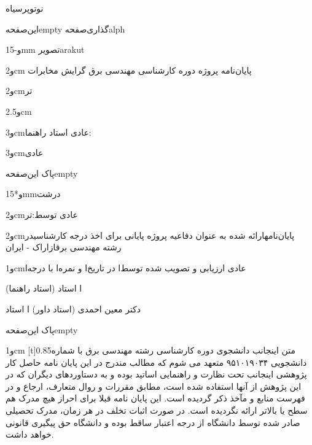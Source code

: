 ‌نو{توپر}{‌سیاه}{}

‌این‌صفحه{empty}
‌گذاری‌صفحه{alph}‬


\onehalfspacing

‌و{-15mm}
‌تصویر{arakut}

\departfa

‌و{2cm} پایان‌نامه پروژه دوره کارشناسی مهندسی برق گرایش مخابرات

‌و{2cm}‌تر\titlefa

‌و{2.5cm}\authorfa

‌و{3cm}‌عادی استاد راهنما: \supervisorfa

‌و{3cm}‌عادی\datefa


‌پاک
‌این‌صفحه{empty}


‌و*{15mm}‌درشت\titlefa

‌و{2cm}‌عادی توسط:‌تر\authorfa

‌و{2cm} پایان‌نامه ارائه شده به عنوان دفاعیه پروژه پایانی برای اخذ درجه کارشناسی در رشته مهندسی برق از \instfa{} اراک - ایران

\doublespacing

‌و{1cm}‌عادی ارزیابی و تصویب شده
توسط‌ا{} در تاریخ‌ا{} و نمره‌ا{} با درجه‌ا{}

\supervisorfa
(استاد راهنما) ‌ا
استاد \instfa

دکتر معین احمدی
(استاد داور) ‌ا
استاد \instfa


‌پاک
‌این‌صفحه{empty}


‌و{1cm}
[t]{0.85‌متن}
\onehalfspacing
اینجانب \authorfa{} دانشجوی دوره کارشناسی رشته مهندسی برق با شماره دانشجویی ۹۵۱۰۱۹۰۳۴ متعهد می شوم که مطالب مندرج در این پايان نامه حاصل کار پژوهشی اینجانب تحت نظارت و راهنمایی اساتید \instfa بوده و به دستاوردهای دیگران که در این پژوهش از آنها استفاده شده است، مطابق مقررات و روال متعارف، ارجاع و در فهرست منابع و مآخذ ذکر گردیده است. این پايان نامه  قبلا برای احراز هیچ مدرک هم سطح یا بالاتر ارائه نگردیده است. در صورت اثبات تخلف در هر زمان، مدرک تحصیلی صادر شده توسط دانشگاه از درجه اعتبار ساقط بوده و دانشگاه حق پیگیری قانونی خواهد داشت.

